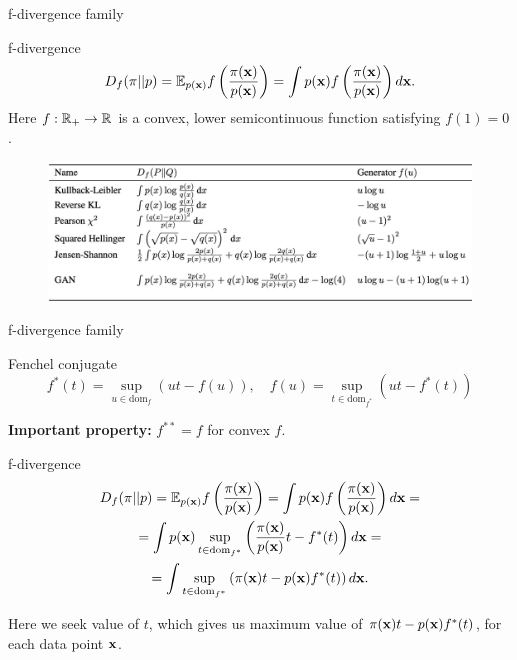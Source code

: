 \begin{frame}{f-divergence family}
	
	\begin{block}{f-divergence}
		\vspace{-0.3cm}
		\[
		D_f(\pi || p) = \mathbb{E}_{p(\mathbf{x})}  f\left( \frac{\pi(\mathbf{x})}{p(\mathbf{x})} \right)  = \int p(\mathbf{x}) f\left( \frac{\pi(\mathbf{x})}{p(\mathbf{x})} \right) d \mathbf{x}.
		\]
		Here $f: \mathbb{R}_+ \rightarrow \mathbb{R}$ is a convex, lower semicontinuous function satisfying $f(1) = 0$.
	\end{block}
	\begin{figure}
		\centering
		\includegraphics[width=\linewidth]{figs/f_divs}
	\end{figure}
\end{frame}
\begin{frame}{f-divergence family}
	\vspace{-0.2cm}
	\begin{block}{Fenchel conjugate}
		\vspace{-0.7cm}
		\[
		f^*(t) = \sup_{u \in \text{dom}_f} \left( ut - f(u) \right), \quad f(u) = \sup_{t \in \text{dom}_{f^*}} \left( ut - f^*(t) \right)
		\]
		\vspace{-0.5cm}
	\end{block}
	\textbf{Important property:} $ f^{**} = f$ for convex $f$.
	\begin{block}{f-divergence}
		\vspace{-0.8cm}
		\begin{multline*}
			D_f(\pi || p) = \mathbb{E}_{p(\mathbf{x})}  f\left( \frac{\pi(\mathbf{x})}{p(\mathbf{x})} \right)  = \int p(\mathbf{x}) f\left( \frac{\pi(\mathbf{x})}{p(\mathbf{x})} \right) d \mathbf{x} = \\ = \int p(\mathbf{x}) \sup_{t \in \text{dom}_{f^*}} \left( \frac{\pi(\mathbf{x})}{p(\mathbf{x})} t - f^*(t) \right) d \mathbf{x} = \\ 
			= \int \sup_{t \in \text{dom}_{f^*}} \left( \pi(\mathbf{x})t - p(\mathbf{x}) f^*(t) \right) d \mathbf{x} .
		\end{multline*}
		\vspace{-0.6cm}
	\end{block}
	Here we seek value of $t$, which gives us maximum value of $ \pi(\mathbf{x})t - p(\mathbf{x}) f^*(t)$, for each data point $\mathbf{x}$.
\end{frame}
